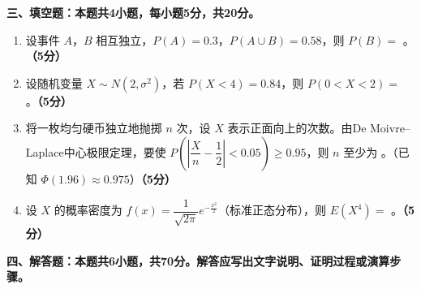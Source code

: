 \documentclass[12pt, a4paper]{ctexart}
\newcommand{\score}[1]{\hfill\textbf{（#1分）}}
\begin{document}
\vspace{10pt}

{\large\bfseries 三、填空题：本题共4小题，每小题5分，共20分。}

\vspace{8pt}

\begin{enumerate}[resume]

\item 设事件 $A$，$B$ 相互独立，$P(A)=0.3$，$P(A\cup B)=0.58$，则 $P(B)=$ \underline{\hspace{2cm}}。\score{5}

\item 设随机变量 $X\sim N(2, \sigma^2)$，若 $P(X<4)=0.84$，则 $P(0<X<2)=$ \underline{\hspace{2cm}}。\score{5}

\item 将一枚均匀硬币独立地抛掷 $n$ 次，设 $X$ 表示正面向上的次数。由De Moivre--Laplace中心极限定理，要使 $P\left(\left|\dfrac{X}{n}-\dfrac{1}{2}\right|<0.05\right)\geq 0.95$，则 $n$ 至少为 \underline{\hspace{2cm}}。（已知 $\Phi(1.96)\approx 0.975$）\score{5}

\item 设 $X$ 的概率密度为 $f(x)=\dfrac{1}{\sqrt{2\pi}}e^{-\frac{x^2}{2}}$（标准正态分布），则 $E(X^4)=$ \underline{\hspace{2cm}}。\score{5}

\end{enumerate}

\vspace{10pt}

{\large\bfseries 四、解答题：本题共6小题，共70分。解答应写出文字说明、证明过程或演算步骤。}

\vspace{8pt}
\end{document}
